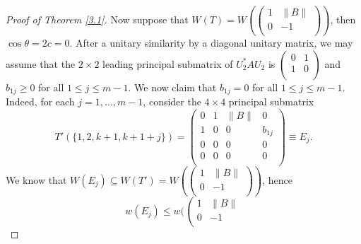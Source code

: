 \documentclass[11pt]{article}
\numberwithin{equation}{section}
\begin{document}
\begin{proof}[Proof of Theorem \ref{3.1}]
Now suppose that $W(T)=W(\left(
                             \begin{array}{cc}
                               1 & \|B\| \\
                               0 & -1 \\
                             \end{array}
                           \right)
)$, then $\cos\theta=2c=0$.
After a unitary similarity by a diagonal unitary matrix, we may assume that the $2\times 2$ leading principal submatrix of $U_2^*AU_2$ is $\left(                                                                                               \begin{array}{cc}                                                                                                   0 & 1 \\                                                                                                   1 & 0 \\                                                                                                 \end{array}                                                                                               \right)$ and $b_{1j}\ge 0$ for all $1\le j\le m-1$.
We now claim that $b_{1j}=0$ for all $1\le j\le m-1$.  Indeed, for each $j=1, \dots, m-1$, consider the $4\times 4$ principal submatrix
$$T'(\{1, 2, k+1, k+1+j\})=
\left(
  \begin{array}{cccc}
    0 & 1 & \|B\| & 0 \\
    1 & 0 & 0 & b_{1j} \\
    0 & 0 & 0 & 0 \\
    0 & 0 & 0 & 0 \\
  \end{array}
\right)\equiv  E_j.$$
We know that $W(E_j)\subseteq W(T')=W(\left(
                        \begin{array}{cc}
                          1 & \|B\| \\
                          0 & -1\\
                        \end{array}
                      \right)
)$, hence
$$w(E_j)\le w(\left(
                        \begin{array}{cc}
                          1 & \|B\| \\
                          0 & -1\\
                        \end{array}
$$
\end{proof}
\end{document}
